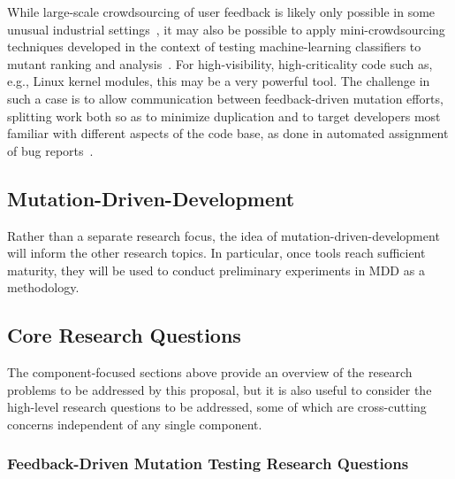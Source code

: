 While large-scale crowdsourcing of user feedback is likely only
possible in some unusual industrial
settings~\cite{MutGoogle,ivankovic2018industrial}, it may also be
possible to apply mini-crowdsourcing techniques developed in the
context of testing machine-learning classifiers to mutant ranking and
analysis~\cite{Minicrowd}.  For high-visibility, high-criticality code
such as, e.g., Linux kernel modules, this may be a very powerful
tool.  The challenge in such a case is to allow communication between
feedback-driven mutation efforts, splitting work both so as to
minimize duplication and to target developers most familiar with
different aspects of the code base, as done in automated assignment of
bug reports~\cite{bhattacharya2012automated,jonsson2016automated}.


\subsection{Mutation-Driven-Development}

Rather than a separate research focus, the idea of
mutation-driven-development will inform the other
research topics.  In particular, once tools
reach sufficient maturity, they will be used to conduct preliminary
experiments in MDD as a methodology.  %

\subsection{Core Research Questions}

The component-focused sections above provide an overview of the
research problems to be addressed by this proposal, but it is also
useful to consider the high-level research questions to be addressed,
some of which are cross-cutting concerns independent of any single
component.

\subsubsection{Feedback-Driven Mutation Testing
Research Questions}

